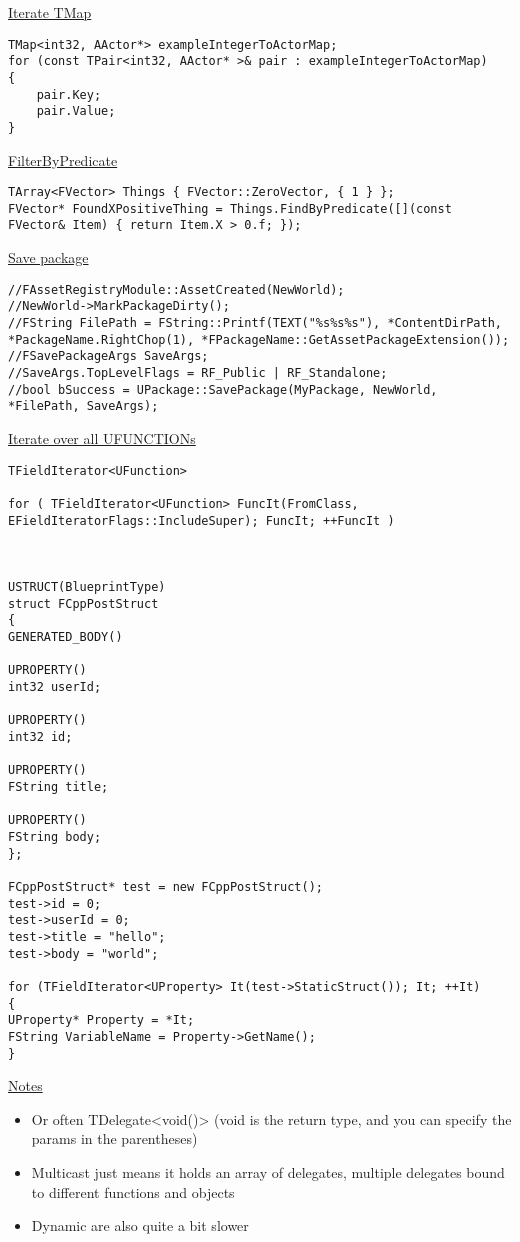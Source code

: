 \uline{Iterate TMap}
\begin{lstlisting}
TMap<int32, AActor*> exampleIntegerToActorMap;
for (const TPair<int32, AActor* >& pair : exampleIntegerToActorMap)
{
    pair.Key;
    pair.Value;
}
\end{lstlisting}
    
\uline{FilterByPredicate}
\begin{lstlisting}
TArray<FVector> Things { FVector::ZeroVector, { 1 } };
FVector* FoundXPositiveThing = Things.FindByPredicate([](const FVector& Item) { return Item.X > 0.f; });    
\end{lstlisting}

\uline{Save package}
\begin{lstlisting}
//FAssetRegistryModule::AssetCreated(NewWorld);
//NewWorld->MarkPackageDirty();
//FString FilePath = FString::Printf(TEXT("%s%s%s"), *ContentDirPath, *PackageName.RightChop(1), *FPackageName::GetAssetPackageExtension());
//FSavePackageArgs SaveArgs;
//SaveArgs.TopLevelFlags = RF_Public | RF_Standalone;
//bool bSuccess = UPackage::SavePackage(MyPackage, NewWorld, *FilePath, SaveArgs);
\end{lstlisting}

\uline{Iterate over all UFUNCTIONs}
\begin{lstlisting}
TFieldIterator<UFunction>

for ( TFieldIterator<UFunction> FuncIt(FromClass, EFieldIteratorFlags::IncludeSuper); FuncIt; ++FuncIt )



USTRUCT(BlueprintType)
struct FCppPostStruct
{
GENERATED_BODY()

UPROPERTY()
int32 userId;

UPROPERTY()
int32 id;

UPROPERTY()
FString title;

UPROPERTY()
FString body;
};

FCppPostStruct* test = new FCppPostStruct();
test->id = 0;
test->userId = 0;
test->title = "hello";
test->body = "world";

for (TFieldIterator<UProperty> It(test->StaticStruct()); It; ++It)
{
UProperty* Property = *It;
FString VariableName = Property->GetName();
}

\end{lstlisting}

\uline{Notes}
\begin{itemize}
\item Or often TDelegate<void()> (void is the return type, and you can specify the params in the parentheses)
\item Multicast just means it holds an array of delegates, multiple delegates bound to different functions and objects
\item Dynamic are also quite a bit slower
\end{itemize}


